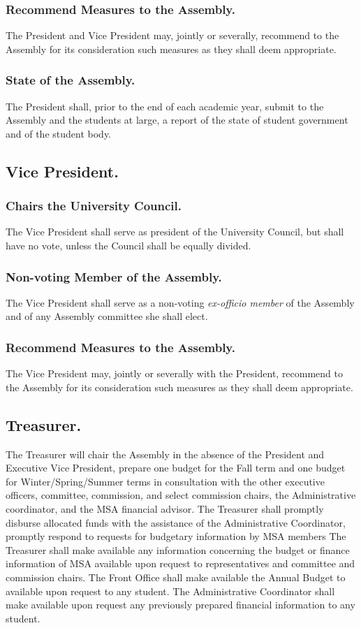 \subsubsection{Recommend Measures to the Assembly.}
The President and Vice President may, jointly or severally, recommend to the Assembly for its consideration such measures as they shall deem appropriate.

\subsubsection{State of the Assembly.}
The President shall, prior to the end of each academic year, submit to the Assembly and the students at large, a report of the state of student government and of the student body.


\subsection{Vice President.}
\subsubsection{Chairs the University Council.}
The Vice President shall serve as president of the University Council, but shall have no vote, unless the Council shall be equally divided.

\subsubsection{Non-voting Member of the Assembly.}
The Vice President shall serve as a non-voting \textit{ex-officio member} of the Assembly and of any Assembly committee she shall elect.

\subsubsection{Recommend Measures to the Assembly.}
The Vice President may, jointly or severally with the President, recommend to the Assembly for its consideration such measures as they shall deem appropriate.


\subsection{Treasurer.}
The Treasurer will chair the Assembly in the absence of the President and Executive Vice President, prepare one budget for the Fall term and one budget for Winter/Spring/Summer terms in consultation with the other executive officers, committee, commission, and select commission chairs, the Administrative coordinator, and the MSA financial advisor. The Treasurer shall promptly disburse allocated funds with the assistance of the Administrative Coordinator, promptly respond to requests for budgetary information by MSA members The Treasurer shall make available any information concerning the budget or finance information of MSA available upon request to representatives and committee and commission chairs. The Front Office shall make available the Annual Budget to available upon request to any student. The Administrative Coordinator shall make available upon request any previously prepared financial information to any student. 

